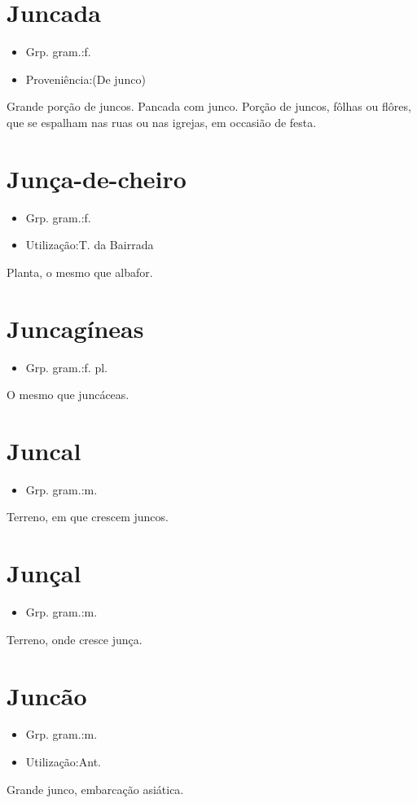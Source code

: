 \documentclass{article}
\begin{document}
\section{Juncada}
\begin{itemize}
\item {Grp. gram.:f.}
\end{itemize}
\begin{itemize}
\item {Proveniência:(De \textunderscore junco\textunderscore )}
\end{itemize}
Grande porção de juncos.
Pancada com junco.
Porção de juncos, fôlhas ou flôres, que se espalham nas ruas ou nas igrejas, em occasião de festa.
\section{Junça-de-cheiro}
\begin{itemize}
\item {Grp. gram.:f.}
\end{itemize}
\begin{itemize}
\item {Utilização:T. da Bairrada}
\end{itemize}
Planta, o mesmo que \textunderscore albafor\textunderscore .
\section{Juncagíneas}
\begin{itemize}
\item {Grp. gram.:f. pl.}
\end{itemize}
O mesmo que \textunderscore juncáceas\textunderscore .
\section{Juncal}
\begin{itemize}
\item {Grp. gram.:m.}
\end{itemize}
Terreno, em que crescem juncos.
\section{Junçal}
\begin{itemize}
\item {Grp. gram.:m.}
\end{itemize}
Terreno, onde cresce junça.
\section{Juncão}
\begin{itemize}
\item {Grp. gram.:m.}
\end{itemize}
\begin{itemize}
\item {Utilização:Ant.}
\end{itemize}
Grande junco, embarcação asiática.
\end{document}
